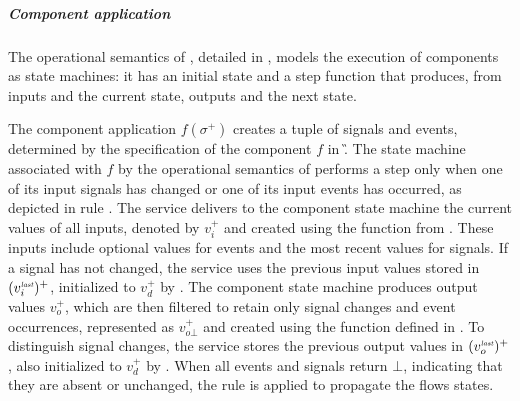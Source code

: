 \subparagraph{Component application}

The operational semantics of \GRSync, detailed in , models the
execution of components as state machines: it has an initial state and a step function that
produces, from inputs and the current state, outputs and the next state.

The component application $f(\sigma^+)$ creates a tuple of signals and events, determined by the
specification of the component $f$ in \G. The state machine associated with $f$ by the operational
semantics of \GRSync performs a step only when one of its input signals has changed or one of its
input events has occurred, as depicted in rule .
%
The service delivers to the component state machine the current values of all inputs, denoted by
$v_i^+$ and created using the function  from . These inputs include optional
values for events and the most recent values for signals. If a signal has not changed, the service
uses the previous input values stored in $(v_i^{\textit{\tiny last}})^+$, initialized to $v_d^+$ by . The component state machine produces output values
$v_o^+$, which are then filtered to retain only signal changes and event occurrences, represented as
$v_{o\bot}^+$ and created using the function  defined in . To distinguish signal
changes, the service stores the previous output values in $(v_o^{\textit{\tiny last}})^+$, also initialized to
$v_d^+$ by .
%
When all events and signals return $\bot$, indicating that they are absent or unchanged, the rule
 is applied to propagate the flows states.

